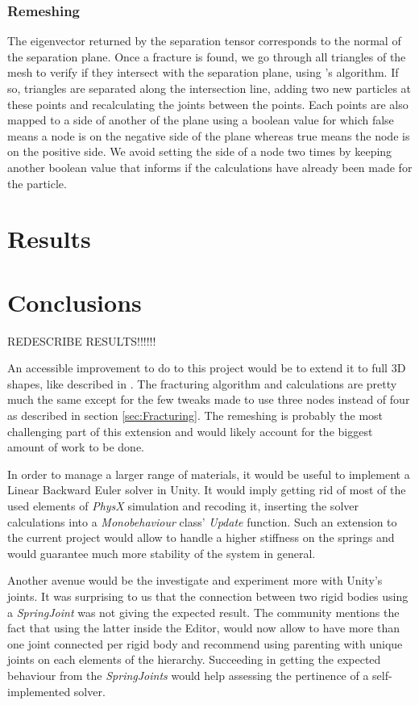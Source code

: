 \documentclass[tog]{acmsiggraph}
\begin{document}
\subsubsection{Remeshing}
The eigenvector returned by the separation tensor corresponds to the normal of the separation plane. Once a fracture is found, we go through all triangles of the mesh to verify if they intersect with the separation plane, using \cite{Inters}'s algorithm. If so, triangles are separated along the intersection line, adding two new particles at these points and recalculating the joints between the points. Each points are also mapped to a side of another of the plane using a boolean value for which false means a node is on the negative side of the plane whereas true means the node is on the positive side. We avoid setting the side of a node two times by keeping another boolean value that informs if the calculations have already been made for the particle. 

\section{Results}



\section{Conclusions}

REDESCRIBE RESULTS!!!!!!

An accessible improvement to do to this project would be to extend it to full 3D shapes, like described in \cite{Obrien:1999:GMA}. The fracturing algorithm and calculations are pretty much the same except for the few tweaks made to use three nodes instead of four as described in section \ref{sec:Fracturing}. The remeshing is probably the most challenging part of this extension and would likely account for the biggest amount of work to be done. 

In order to manage a larger range of materials, it would be useful to implement a Linear Backward Euler solver in Unity. It would imply getting rid of most of the used elements of \textit{PhysX} simulation and recoding it, inserting the solver calculations into a \textit{Monobehaviour} class' \textit{Update} function. Such an extension to the current project would allow to handle a higher stiffness on the springs and would guarantee much more stability of the system in general. 

Another avenue would be the investigate and experiment more with Unity's joints. It was surprising to us that the connection between two rigid bodies using a \textit{SpringJoint} was not giving the expected result. The community mentions the fact that using the latter inside the Editor, would now allow to have more than one joint connected per rigid body and recommend using parenting with unique joints on each elements of the hierarchy. Succeeding in getting the expected behaviour from the \textit{SpringJoints} would help assessing the pertinence of a self-implemented solver.  
\end{document}

